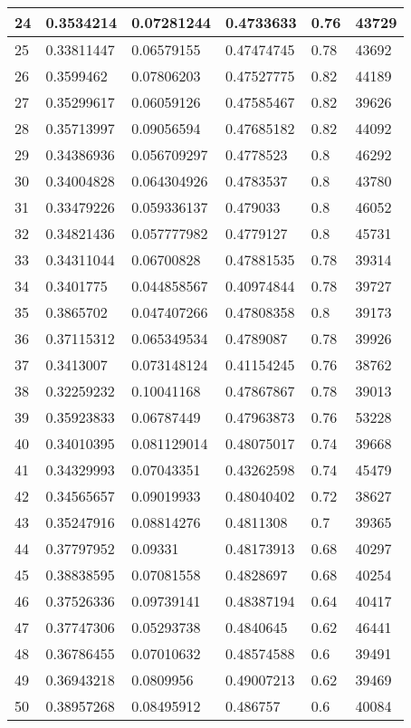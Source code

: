 \begin{longtable}{|l|l|l|l|l|l|}
24 & 0.3534214 & 0.07281244 & 0.4733633 & 0.76 & 43729 \\ \hline 
25 & 0.33811447 & 0.06579155 & 0.47474745 & 0.78 & 43692 \\ \hline 
26 & 0.3599462 & 0.07806203 & 0.47527775 & 0.82 & 44189 \\ \hline 
27 & 0.35299617 & 0.06059126 & 0.47585467 & 0.82 & 39626 \\ \hline 
28 & 0.35713997 & 0.09056594 & 0.47685182 & 0.82 & 44092 \\ \hline 
29 & 0.34386936 & 0.056709297 & 0.4778523 & 0.8 & 46292 \\ \hline 
30 & 0.34004828 & 0.064304926 & 0.4783537 & 0.8 & 43780 \\ \hline 
31 & 0.33479226 & 0.059336137 & 0.479033 & 0.8 & 46052 \\ \hline 
32 & 0.34821436 & 0.057777982 & 0.4779127 & 0.8 & 45731 \\ \hline 
33 & 0.34311044 & 0.06700828 & 0.47881535 & 0.78 & 39314 \\ \hline 
34 & 0.3401775 & 0.044858567 & 0.40974844 & 0.78 & 39727 \\ \hline 
35 & 0.3865702 & 0.047407266 & 0.47808358 & 0.8 & 39173 \\ \hline 
36 & 0.37115312 & 0.065349534 & 0.4789087 & 0.78 & 39926 \\ \hline 
37 & 0.3413007 & 0.073148124 & 0.41154245 & 0.76 & 38762 \\ \hline 
38 & 0.32259232 & 0.10041168 & 0.47867867 & 0.78 & 39013 \\ \hline 
39 & 0.35923833 & 0.06787449 & 0.47963873 & 0.76 & 53228 \\ \hline 
40 & 0.34010395 & 0.081129014 & 0.48075017 & 0.74 & 39668 \\ \hline 
41 & 0.34329993 & 0.07043351 & 0.43262598 & 0.74 & 45479 \\ \hline 
42 & 0.34565657 & 0.09019933 & 0.48040402 & 0.72 & 38627 \\ \hline 
43 & 0.35247916 & 0.08814276 & 0.4811308 & 0.7 & 39365 \\ \hline 
44 & 0.37797952 & 0.09331 & 0.48173913 & 0.68 & 40297 \\ \hline 
45 & 0.38838595 & 0.07081558 & 0.4828697 & 0.68 & 40254 \\ \hline 
46 & 0.37526336 & 0.09739141 & 0.48387194 & 0.64 & 40417 \\ \hline 
47 & 0.37747306 & 0.05293738 & 0.4840645 & 0.62 & 46441 \\ \hline 
48 & 0.36786455 & 0.07010632 & 0.48574588 & 0.6 & 39491 \\ \hline 
49 & 0.36943218 & 0.0809956 & 0.49007213 & 0.62 & 39469 \\ \hline 
50 & 0.38957268 & 0.08495912 & 0.486757 & 0.6 & 40084 \\ \hline 
\end{longtable}